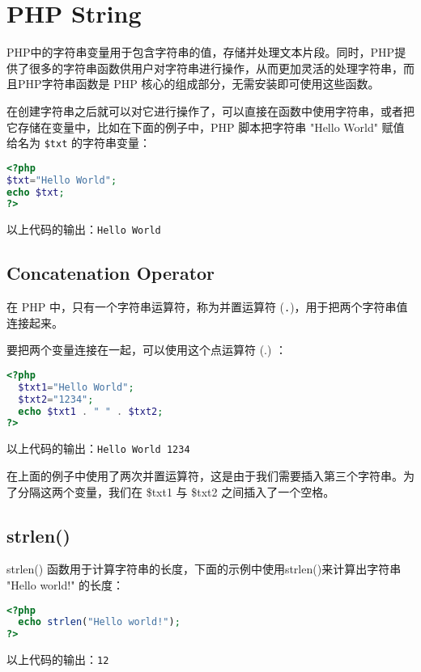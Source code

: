 \chapter{PHP String}


PHP中的字符串变量用于包含字符串的值，存储并处理文本片段。同时，PHP提供了很多的字符串函数供用户对字符串进行操作，从而更加灵活的处理字符串，而且PHP字符串函数是 PHP 核心的组成部分，无需安装即可使用这些函数。


在创建字符串之后就可以对它进行操作了，可以直接在函数中使用字符串，或者把它存储在变量中，比如在下面的例子中，PHP 脚本把字符串 "Hello World" 赋值给名为 \texttt{\$txt} 的字符串变量：


\begin{lstlisting}[language=PHP]
<?php
$txt="Hello World";
echo $txt;
?>
\end{lstlisting}


以上代码的输出：\verb|Hello World|


\section{Concatenation Operator}



在 PHP 中，只有一个字符串运算符，称为并置运算符 (\texttt{.})，用于把两个字符串值连接起来。

要把两个变量连接在一起，可以使用这个点运算符 (.) ：

\begin{lstlisting}[language=PHP]
<?php
  $txt1="Hello World";
  $txt2="1234";
  echo $txt1 . " " . $txt2;
?>
\end{lstlisting}


以上代码的输出：\verb|Hello World 1234|


在上面的例子中使用了两次并置运算符，这是由于我们需要插入第三个字符串。为了分隔这两个变量，我们在 \$txt1 与 \$txt2 之间插入了一个空格。


\section{strlen()}


strlen() 函数用于计算字符串的长度，下面的示例中使用strlen()来计算出字符串 "Hello world!" 的长度：

\begin{lstlisting}[language=PHP]
<?php
  echo strlen("Hello world!");
?>
\end{lstlisting}


以上代码的输出：\verb|12|

